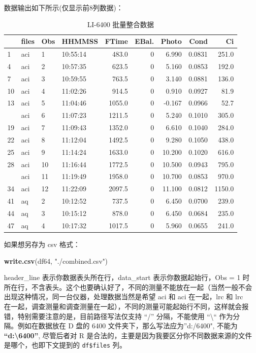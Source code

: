 \documentclass[
]{krantz}
\makeatletter
\newenvironment{Shaded}{\begin{snugshade}}{\end{snugshade}}
\newcommand{\KeywordTok}[1]{\textcolor[rgb]{0.13,0.29,0.53}{\textbf{#1}}}
\newcommand{\NormalTok}[1]{#1}
\newcommand{\StringTok}[1]{\textcolor[rgb]{0.31,0.60,0.02}{#1}}
\newenvironment{kframe}{%
\medskip{}
\setlength{\fboxsep}{.8em}
 \def\at@end@of@kframe{}%
 \ifinner\ifhmode%
  \def\at@end@of@kframe{\end{minipage}}%
  \begin{minipage}{\columnwidth}%
 \fi\fi%
 \def\FrameCommand##1{\hskip\@totalleftmargin \hskip-\fboxsep
 \colorbox{shadecolor}{##1}\hskip-\fboxsep
     \hskip-\linewidth \hskip-\@totalleftmargin \hskip\columnwidth}%
 \MakeFramed {\advance\hsize-\width
   \@totalleftmargin\z@ \linewidth\hsize
   \@setminipage}}%
 {\par\unskip\endMakeFramed%
 \at@end@of@kframe}
\renewenvironment{Shaded}{\begin{kframe}}{\end{kframe}}
\makeatother
\begin{document}
数据输出如下所示(仅显示前8列数据)：

\begin{table}

\caption{\label{tab:unnamed-chunk-5}LI-6400 批量整合数据}
\centering
\begin{tabular}[t]{llllrrrrr}
\toprule
  & files & Obs & HHMMSS & FTime & EBal. & Photo & Cond & Ci\\
\midrule
1 & aci & 1 & 10:55:14 & 483.0 & 0 & 6.990 & 0.0831 & 251.0\\
4 & aci & 2 & 10:57:35 & 623.5 & 0 & 5.160 & 0.0853 & 192.0\\
7 & aci & 3 & 10:59:55 & 763.5 & 0 & 3.140 & 0.0881 & 136.0\\
10 & aci & 4 & 11:02:26 & 914.5 & 0 & 0.910 & 0.0927 & 81.9\\
13 & aci & 5 & 11:04:46 & 1055.0 & 0 & -0.167 & 0.0966 & 52.7\\
\addlinespace
16 & aci & 6 & 11:07:23 & 1211.5 & 0 & 5.240 & 0.1010 & 305.0\\
19 & aci & 7 & 11:09:43 & 1352.0 & 0 & 6.610 & 0.1040 & 284.0\\
22 & aci & 8 & 11:12:04 & 1492.5 & 0 & 9.280 & 0.1050 & 438.0\\
25 & aci & 9 & 11:14:24 & 1633.0 & 0 & 10.200 & 0.1020 & 616.0\\
28 & aci & 10 & 11:16:44 & 1772.5 & 0 & 10.500 & 0.0943 & 795.0\\
\addlinespace
31 & aci & 11 & 11:19:49 & 1958.0 & 0 & 10.700 & 0.0853 & 970.0\\
34 & aci & 12 & 11:22:09 & 2097.5 & 0 & 11.100 & 0.0812 & 1150.0\\
41 & aq & 2 & 10:12:52 & 737.5 & 0 & 6.450 & 0.0700 & 239.0\\
44 & aq & 3 & 10:15:12 & 878.0 & 0 & 6.450 & 0.0684 & 235.0\\
47 & aq & 4 & 10:17:32 & 1017.5 & 0 & 5.960 & 0.0655 & 241.0\\
\bottomrule
\end{tabular}
\end{table}

如果想另存为 csv 格式：

\begin{Shaded}
\begin{Highlighting}[]
\KeywordTok{write.csv}\NormalTok{(df64, }\StringTok{"./combined.csv"}\NormalTok{)}
\end{Highlighting}
\end{Shaded}

header\_line 表示你数据表头所在行，data\_start 表示你数据起始行，Obs = 1 时所在行，不含表头。这个也要确认好了，不同的测量不能放在一起（当然一般不会出现这种情况，同一台仪器，处理数据当然是希望 aci 和 aci 在一起，lrc 和 lrc 在一起，调查测量和调查测量在一起），不同的测量可能起始行不同，这样就会报错，特别需要注意的是，目前路径写法仅支持 ``/'' 分隔，不能使用 ``\textbackslash`` 作为分隔。例如在数据放在 D 盘的 6400 文件夹下，那么写法应为''d:/6400", 不能为 \textbf{``d:\textbackslash6400''}, 尽管后者对 R 是合法的，主要是因为我要区分你不同数据来源的文件是哪个，也即下文提到的 \texttt{df\$files} 列。
\end{document}
